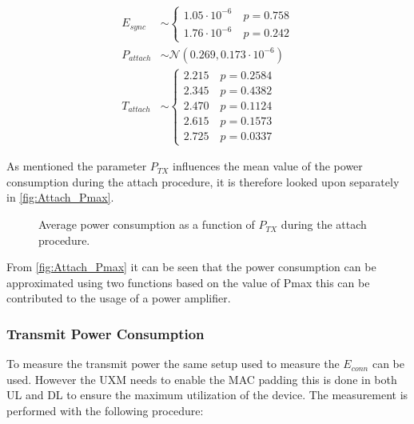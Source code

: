\begin{align}
E_{sync} &\sim\begin{cases} 1.05\cdot 10^{-6} \quad p = 0.758\\
1.76\cdot 10^{-6} \quad p = 0.242
\end{cases}\\
P_{attach} &\sim\mathcal{N}(0.269,0.173\cdot 10^{-6}) \\
T_{attach} &\sim\begin{cases} 2.215 \quad p = 0.2584\\
2.345 \quad p = 0.4382\\
2.470 \quad p = 0.1124\\
2.615 \quad p = 0.1573\\
2.725 \quad p = 0.0337
\end{cases}
\end{align}

As mentioned the parameter $P_{TX}$ influences the mean value of the power consumption during the attach procedure, it is therefore looked upon separately in \autoref{fig:Attach_Pmax}. 

\begin{figure}[H]
\centering
\resizebox{0.7\textwidth}{!}{
}
\caption{Average power consumption as a function of $P_{TX}$ during the attach procedure.}
\label{fig:Attach_Pmax}
\end{figure}

From \autoref{fig:Attach_Pmax} it can be seen that the power consumption can be approximated using two functions based on the value of Pmax this can be contributed to the usage of a power amplifier. 

\subsubsection{Transmit Power Consumption}

To measure the transmit power the same setup used to measure the $E_{conn}$ can be used. However the UXM needs to enable the MAC padding this is done in both UL and DL to ensure the maximum utilization of the device. The measurement is performed with the following procedure:



